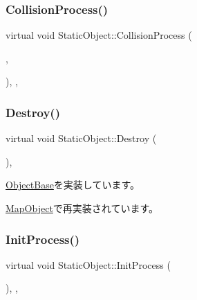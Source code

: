 \subsubsection{\texorpdfstring{Collision\+Process()}{CollisionProcess()}}
{\footnotesize\ttfamily virtual void Static\+Object\+::\+Collision\+Process (\begin{DoxyParamCaption}\item[{\mbox{\hyperlink{class_object_base}{Object\+Base}} $\ast$}]{,  }\item[{\mbox{\hyperlink{transform_8h_afb0c5e21d4133ff4f200992c0b534e1b}{V\+E\+C2}}}]{ }\end{DoxyParamCaption})\hspace{0.3cm}{\ttfamily [inline]}, {\ttfamily [protected]}, {\ttfamily [virtual]}}

\mbox{\label{class_static_object_a8e9fb321b4f8f12c4bec1bc66853512f}} 
\subsubsection{\texorpdfstring{Destroy()}{Destroy()}}
{\footnotesize\ttfamily virtual void Static\+Object\+::\+Destroy (\begin{DoxyParamCaption}{ }\end{DoxyParamCaption})\hspace{0.3cm}{\ttfamily [inline]}, {\ttfamily [virtual]}}



\mbox{\hyperlink{class_object_base_a7fa4c548153c3af20f89673ffea809af}{Object\+Base}}を実装しています。



\mbox{\hyperlink{class_map_object_ad4bcfdc33bd945a9aa5e50a57c2704bc}{Map\+Object}}で再実装されています。

\mbox{\label{class_static_object_afa0709f50495338a23c1140062a567af}} 
\subsubsection{\texorpdfstring{Init\+Process()}{InitProcess()}}
{\footnotesize\ttfamily virtual void Static\+Object\+::\+Init\+Process (\begin{DoxyParamCaption}{ }\end{DoxyParamCaption})\hspace{0.3cm}{\ttfamily [inline]}, {\ttfamily [protected]}, {\ttfamily [virtual]}}




